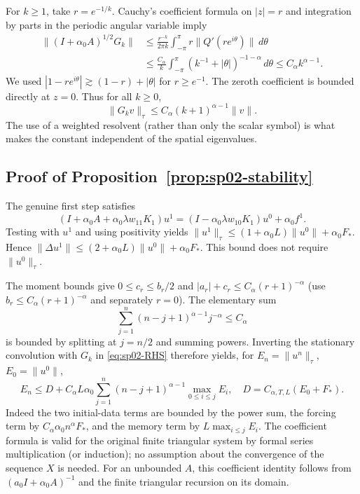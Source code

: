 \documentclass[11pt,a4paper]{amsart}
\theoremstyle{remark}
\theoremstyle{plain}
\theoremstyle{remark}
\numberwithin{equation}{section}
\begin{document}
For $k\ge1$, take $r=e^{-1/k}$. Cauchy's coefficient formula on $|z|=r$ and integration by parts in the periodic angular variable imply
\begin{align*}
 \|(I+\alpha_0 A)^{1/2}G_k\|
 &\le \frac{r^{-k}}{2\pi k}\int_{-\pi}^{\pi}r\|Q'(re^{i\theta})\|\,d\theta\\
 &\le \frac{C_\alpha}{k}\int_{-\pi}^{\pi}(k^{-1}+|\theta|)^{-1-\alpha}\,d\theta
 \le C_\alpha k^{\alpha-1}.
\end{align*}
We used $|1-re^{i\theta}|\gtrsim(1-r)+|\theta|$ for $r\ge e^{-1}$. The zeroth coefficient is bounded directly at $z=0$. Thus for all $k\ge0$,
\begin{equation}\label{eq:sp02-green}
 \|G_k v\|_\tau\le C_\alpha(k+1)^{\alpha-1}\|v\|.
\end{equation}
The use of a weighted resolvent (rather than only the scalar symbol) is what makes the constant independent of the spatial eigenvalues.

\subsection{Proof of Proposition~\ref{prop:sp02-stability}}
The genuine first step satisfies
\[
 (I+\alpha_0 A+\alpha_0\lambda w_{11}K_1)u^1
 =(I-\alpha_0\lambda w_{10}K_1)u^0+\alpha_0 f^1.
\]
Testing with $u^1$ and using positivity yields $\|u^1\|_\tau\le (1+\alpha_0 L)\|u^0\|+\alpha_0 F_*$. Hence $\|\Delta u^1\|\le (2+\alpha_0 L)\|u^0\|+\alpha_0 F_*$. This bound does not require $\|u^0\|_\tau$.

The moment bounds give $0\le c_r\le b_r/2$ and $|a_r|+c_r\le C_\alpha(r+1)^{-\alpha}$ (use $b_r\le C_\alpha(r+1)^{-\alpha}$ and separately $r=0$). The elementary sum
\[
 \sum_{j=1}^n(n-j+1)^{\alpha-1}j^{-\alpha}\le C_\alpha
\]
is bounded by splitting at $j=n/2$ and summing powers. Inverting the stationary convolution with $G_k$ in \eqref{eq:sp02-RHS} therefore yields, for $E_n=\|u^n\|_\tau$, $E_0=\|u^0\|$,
\begin{equation}\label{eq:sp02-volterra-bound}
 E_n\le D+C_\alpha L\alpha_0\sum_{j=1}^n(n-j+1)^{\alpha-1}\max_{0\le i\le j}E_i,
 \quad D=C_{\alpha,T,L}(E_0+F_*).
\end{equation}
Indeed the two initial-data terms are bounded by the power sum, the forcing term by $C_\alpha\alpha_0 n^\alpha F_*$, and the memory term by $L\max_{i\le j}E_i$. The coefficient formula is valid for the original finite triangular system by formal series multiplication (or induction); no assumption about the convergence of the sequence $X$ is needed. For an unbounded $A$, this coefficient identity follows from $(a_0I+\alpha_0 A)^{-1}$ and the finite triangular recursion on its domain.
\end{document}
